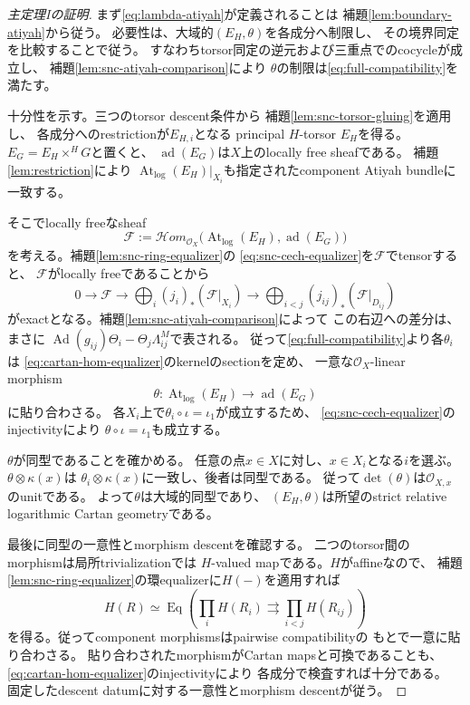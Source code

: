 \documentclass[uplatex,dvipdfmx,11pt]{jsarticle}
\numberwithin{equation}{section}
\theoremstyle{plain}
\theoremstyle{definition}
\theoremstyle{remark}
\DeclareMathOperator{\At}{At}
\DeclareMathOperator{\ad}{ad}
\DeclareMathOperator{\Ad}{Ad}
\newcommand{\OO}{\mathcal O}
\newcommand{\Atlog}{\At_{\log}}
\begin{document}
\begin{proof}[主定理Iの証明]
まず\eqref{eq:lambda-atiyah}が定義されることは
補題\ref{lem:boundary-atiyah}から従う。
必要性は、大域的$(E_H,\theta)$を各成分へ制限し、
その境界同定を比較することで従う。
すなわちtorsor同定の逆元および三重点でのcocycleが成立し、
補題\ref{lem:snc-atiyah-comparison}により
$\theta$の制限は\eqref{eq:full-compatibility}を満たす。

十分性を示す。三つのtorsor descent条件から
補題\ref{lem:snc-torsor-gluing}を適用し、
各成分へのrestrictionが$E_{H,i}$となる
principal $H$-torsor $E_H$を得る。
$E_G=E_H\times^H G$と置くと、
$\ad(E_G)$は$X$上のlocally free sheafである。
補題\ref{lem:restriction}により
$\Atlog(E_H)|_{X_i}$も指定されたcomponent Atiyah bundleに一致する。

そこでlocally freeなsheaf
\[
\mathscr F:=\mathcal{H}om_{\OO_X}
\bigl(\Atlog(E_H),\ad(E_G)\bigr)
\]
を考える。補題\ref{lem:snc-ring-equalizer}の
\eqref{eq:snc-cech-equalizer}を$\mathscr F$でtensorすると、
$\mathscr F$がlocally freeであることから
\begin{equation}\label{eq:cartan-hom-equalizer}
0\longrightarrow\mathscr F\longrightarrow
\bigoplus_i (j_i)_*(\mathscr F|_{X_i})
\longrightarrow
\bigoplus_{i<j}(j_{ij})_*(\mathscr F|_{D_{ij}})
\end{equation}
がexactとなる。補題\ref{lem:snc-atiyah-comparison}によって
この右辺への差分は、まさに
$\Ad(g_{ij})\Theta_i-\Theta_j\Lambda^M_{ij}$で表される。
従って\eqref{eq:full-compatibility}より各$\theta_i$は
\eqref{eq:cartan-hom-equalizer}のkernelのsectionを定め、
一意な$\OO_X$-linear morphism
\[
\theta:\Atlog(E_H)\longrightarrow\ad(E_G)
\]
に貼り合わさる。
各$X_i$上で$\theta_i\circ\iota=\iota_1$が成立するため、
\eqref{eq:snc-cech-equalizer}のinjectivityにより
$\theta\circ\iota=\iota_1$も成立する。

$\theta$が同型であることを確かめる。
任意の点$x\in X$に対し、$x\in X_i$となる$i$を選ぶ。
$\theta\otimes\kappa(x)$は
$\theta_i\otimes\kappa(x)$に一致し、後者は同型である。
従って$\det(\theta)$は$\OO_{X,x}$のunitである。
よって$\theta$は大域的同型であり、
$(E_H,\theta)$は所望のstrict relative logarithmic Cartan geometryである。

最後に同型の一意性とmorphism descentを確認する。
二つのtorsor間のmorphismは局所trivializationでは
$H$-valued mapである。$H$がaffineなので、
補題\ref{lem:snc-ring-equalizer}の環equalizerに$H(-)$を適用すれば
\[
H(R)\simeq
\operatorname{Eq}\left(
\prod_i H(R_i)\rightrightarrows\prod_{i<j}H(R_{ij})
\right)
\]
を得る。従ってcomponent morphismsはpairwise compatibilityの
もとで一意に貼り合わさる。
貼り合わされたmorphismがCartan mapsと可換であることも、
\eqref{eq:cartan-hom-equalizer}のinjectivityにより
各成分で検査すれば十分である。
固定したdescent datumに対する一意性とmorphism descentが従う。
\end{proof}
\end{document}
